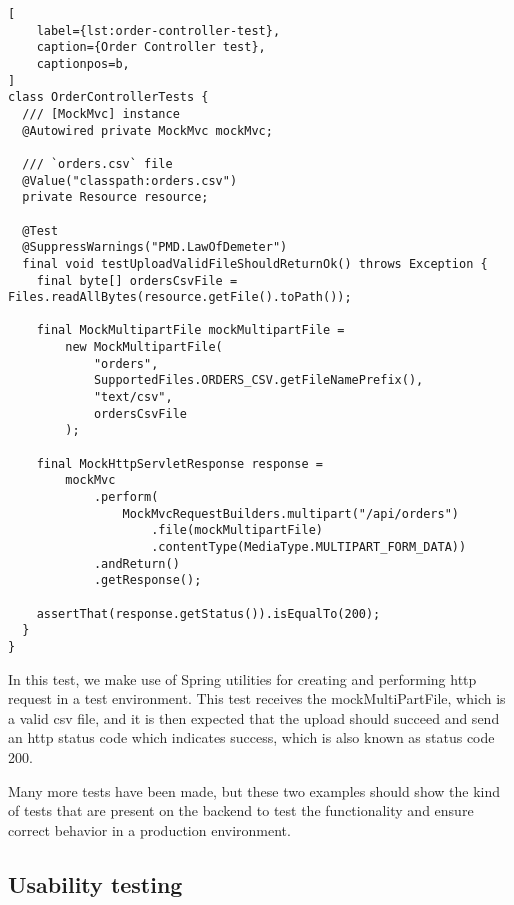 \begin{lstlisting}[
    label={lst:order-controller-test},
    caption={Order Controller test},
    captionpos=b,
]
class OrderControllerTests {
  /// [MockMvc] instance
  @Autowired private MockMvc mockMvc;

  /// `orders.csv` file
  @Value("classpath:orders.csv")
  private Resource resource;

  @Test
  @SuppressWarnings("PMD.LawOfDemeter")
  final void testUploadValidFileShouldReturnOk() throws Exception {
    final byte[] ordersCsvFile = Files.readAllBytes(resource.getFile().toPath());

    final MockMultipartFile mockMultipartFile =
        new MockMultipartFile(
            "orders",
            SupportedFiles.ORDERS_CSV.getFileNamePrefix(),
            "text/csv",
            ordersCsvFile
        );

    final MockHttpServletResponse response =
        mockMvc
            .perform(
                MockMvcRequestBuilders.multipart("/api/orders")
                    .file(mockMultipartFile)
                    .contentType(MediaType.MULTIPART_FORM_DATA))
            .andReturn()
            .getResponse();

    assertThat(response.getStatus()).isEqualTo(200);
  }
}
\end{lstlisting}

In this test, we make use of Spring utilities for creating and performing http request in a test
environment.
This test receives the mockMultiPartFile, which is a valid csv file, and it is then expected that the
upload should succeed and send an http status code which indicates success,
which is also known as status code 200.

Many more tests have been made, but these two examples should show the kind of tests that are
present on the backend to test the functionality and ensure correct behavior in a
production environment.
\subsection{Usability testing}\label{subsec:usability-tests}
